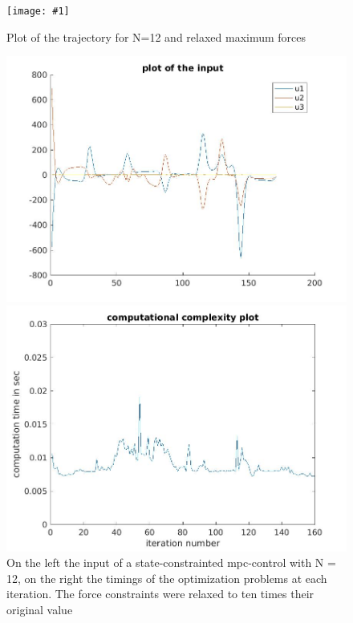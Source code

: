 \documentclass[•]{article}
\newcommand{\apicture}[2] {
  \begin{figure}[H]
  \centering
  \texttt{[image: \#1]}
  \caption{#2}
  \end{figure}
  }
\begin{document}
\apicture{mpctrajforce12.jpg}{Plot of the trajectory for N=12 and relaxed maximum forces}

\begin{figure}[H]
\begin{minipage}{.45\textwidth}
\includegraphics[width = \textwidth]{mpcinputforce12.jpg}
\end{minipage}
\begin{minipage}{.45\textwidth}
\includegraphics[width = \textwidth]{comptimeforce12.jpg}
\end{minipage}
\caption{On the left the input of a state-constrainted mpc-control with N = 12, on the right the timings of the optimization problems at each iteration. The force constraints were relaxed to ten times their original value}
\end{figure}
\end{document}

